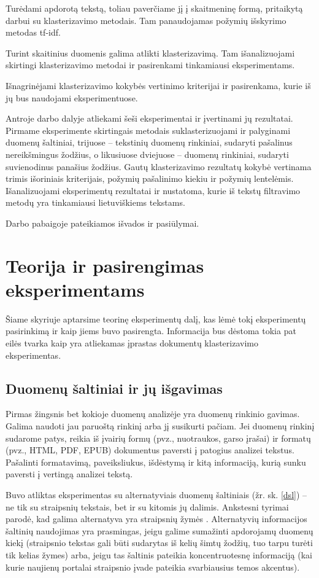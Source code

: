 \documentclass{VUMIFInfBakalaurinis}
\begin{document}
Turėdami apdorotą tekstą, toliau paverčiame jį į skaitmeninę formą,
  pritaikytą darbui su klasterizavimo metodais. Tam panaudojamas požymių
  išskyrimo metodas tf-idf.

Turint skaitinius duomenis galima atlikti klasterizavimą. Tam
  išanalizuojami skirtingi klasterizavimo metodai ir pasirenkami
  tinkamiausi eksperimentams.

Išnagrinėjami klasterizavimo kokybės vertinimo kriterijai ir
  pasirenkama, kurie iš jų bus naudojami eksperimentuose.


Antroje darbo dalyje atliekami šeši eksperimentai ir įvertinami jų
rezultatai. Pirmame eksperimente skirtingais metodais suklasterizuojami
ir palyginami duomenų šaltiniai, trijuose -- tekstinių duomenų
rinkiniai, sudaryti pašalinus nereikšmingus žodžius, o likusiuose
dviejuose -- duomenų rinkiniai, sudaryti suvienodinus panašius žodžius.
Gautų klasterizavimo rezultatų kokybė vertinama trimis išoriniais
kriterijais, požymių pašalinimo kiekiu ir požymių lentelėmis.
Išanalizuojami eksperimentų rezultatai ir nustatoma, kurie iš tekstų
filtravimo metodų yra tinkamiausi lietuviškiems tekstams.

Darbo pabaigoje pateikiamos išvados ir pasiūlymai.

\section{Teorija ir pasirengimas eksperimentams}

Šiame skyriuje aptarsime teorinę eksperimentų dalį, kas lėmė tokį
eksperimentų pasirinkimą ir kaip jiems buvo pasirengta.
Informacija bus dėstoma tokia pat eilės tvarka kaip yra atliekamas
įprastas dokumentų klasterizavimo eksperimentas.

\subsection{Duomenų šaltiniai ir jų išgavimas}

Pirmas žingsnis bet kokioje duomenų analizėje yra duomenų rinkinio
gavimas. Galima naudoti jau paruoštą rinkinį arba jį susikurti pačiam.
Jei duomenų rinkinį sudarome patys, reikia iš įvairių formų (pvz.,
nuotraukos, garso įrašai) ir formatų (pvz., HTML, PDF, EPUB) dokumentus
paversti į patogius analizei tekstus. Pašalinti formatavimą,
paveiksliukus, išdėstymą ir kitą informaciją, kurią sunku paversti į
vertingą analizei tekstą.

Buvo atliktas eksperimentas su alternatyviais duomenų
šaltiniais (žr. sk. \ref{dsl}) -- ne tik su straipsnių
tekstais, bet ir su kitomis jų dalimis. Ankstesni tyrimai parodė, kad
galima alternatyva yra straipsnių žymės \cite{vzalinauskas2006individualiai}.
Alternatyvių informacijos šaltinių naudojimas yra prasmingas, jeigu
galime sumažinti apdorojamų duomenų kiekį (straipsnio tekstas gali būti
sudarytas iš kelių šimtų žodžių, tuo tarpu turėti tik kelias žymes)
arba, jeigu tas šaltinis pateikia koncentruotesnę informaciją (kai kurie
naujienų portalai straipsnio įvade pateikia svarbiausius temos
akcentus).
\end{document}
